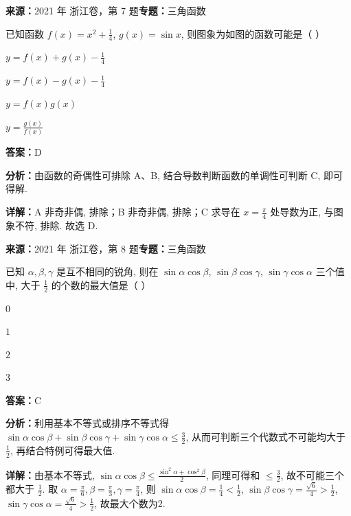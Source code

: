 \begin{question}[points=4]
\textbf{来源：}2021 年 浙江卷，第 7 题\quad \textbf{专题：}三角函数\par
已知函数 $f(x) = x^2 + \frac{1}{4}$, $g(x) = \sin x$, 则图象为如图的函数可能是（   ）
\begin{choices}
  \item $y = f(x) + g(x) - \frac{1}{4}$
  \item $y = f(x) - g(x) - \frac{1}{4}$
  \item $y = f(x)g(x)$
  \item $y = \frac{g(x)}{f(x)}$
\end{choices}
\begin{solution}
\textbf{答案：}D

\textbf{分析：}由函数的奇偶性可排除 A、B, 结合导数判断函数的单调性可判断 C, 即可得解.

\textbf{详解：}A 非奇非偶, 排除；B 非奇非偶, 排除；C 求导在 $x=\frac{\pi}{4}$ 处导数为正, 与图象不符, 排除. 故选 D.
\end{solution}
\end{question}

\begin{question}[points=4]
\textbf{来源：}2021 年 浙江卷，第 8 题\quad \textbf{专题：}三角函数\par
已知 $\alpha,\beta,\gamma$ 是互不相同的锐角, 则在 $\sin\alpha\cos\beta$, $\sin\beta\cos\gamma$, $\sin\gamma\cos\alpha$ 三个值中, 大于 $\frac{1}{2}$ 的个数的最大值是（   ）
\begin{choices}
  \item $0$
  \item $1$
  \item $2$
  \item $3$
\end{choices}
\begin{solution}
\textbf{答案：}C

\textbf{分析：}利用基本不等式或排序不等式得 $\sin\alpha\cos\beta+\sin\beta\cos\gamma+\sin\gamma\cos\alpha \leq \frac{3}{2}$, 从而可判断三个代数式不可能均大于 $\frac{1}{2}$, 再结合特例可得最大值.

\textbf{详解：}由基本不等式, $\sin\alpha\cos\beta \leq \frac{\sin^2\alpha+\cos^2\beta}{2}$, 同理可得和 $\leq \frac{3}{2}$, 故不可能三个都大于 $\frac{1}{2}$. 取 $\alpha=\frac{\pi}{6},\beta=\frac{\pi}{3},\gamma=\frac{\pi}{4}$, 则 $\sin\alpha\cos\beta = \frac{1}{4}<\frac{1}{2}$, $\sin\beta\cos\gamma = \frac{\sqrt{6}}{4}>\frac{1}{2}$, $\sin\gamma\cos\alpha = \frac{\sqrt{6}}{4}>\frac{1}{2}$, 故最大个数为2.
\end{solution}
\end{question}

